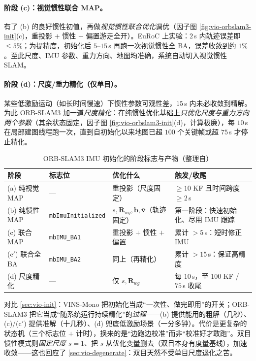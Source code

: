 \paragraph{阶段 (c)：视觉惯性联合 MAP。}
有了 (b) 的良好惯性初值，再做\emph{视觉惯性联合优化}调优（因子图 \cref{fig:vio-orbslam3-init}(c)，重投影 $+$ 惯性 $+$ 偏置游走全开）。EuRoC 上实验：$2\,$s 内轨迹误差即 $\le 5\%$；为提精度，初始化后 $5$--$15\,$s 再跑一次视觉惯性全 BA，误差收敛到约 $1\%$\cite{campos2021orbslam3}。至此尺度、IMU 参数、重力方向、地图均准确，系统自动切入视觉惯性 SLAM。

\paragraph{阶段 (d)：尺度/重力精化（仅单目）。}
某些低激励运动（如长时间慢速）下惯性参数可观性差，$15\,$s 内未必收敛到精解。为此 ORB-SLAM3 加一道\emph{尺度精化}：在纯惯性优化基础上\emph{只优化尺度与重力方向两个参数}（其余状态固定，因子图 \cref{fig:vio-orbslam3-init}(d)，计算极廉），每 $10\,$s 在局部建图线程跑一次，直到自初始化以来地图已超 $100$ 个关键帧或超 $75\,$s 才停止精化\cite{campos2021orbslam3}。

\begin{table}[H]\centering\small
\caption{ORB-SLAM3 IMU 初始化的阶段标志与产物（整理自\cite{campos2021orbslam3,campos2020inertialinit}）}
\label{tab:vio-orbslam3-init}
\begin{tabular}{llll}
\toprule
阶段 & 标志位 & 优化什么 & 触发/收尾 \\
\midrule
(a) 纯视觉 MAP & --- & 重投影（尺度固定） & $\ge 10$ KF 且时间跨度 $\ge 2\,$s \\
(b) 纯惯性 MAP & \texttt{mbImuInitialized} & $s,\mathbf{R}_{wg},\mathbf{b},\bar{\mathbf{v}}$（轨迹固定） & 第一阶段：快速初始化、尽用 IMU 跟踪 \\
(c) 联合 MAP & \texttt{mbIMU\_BA1} & 重投影 $+$ 惯性 $+$ 偏置 & 累计 $>5\,$s：短时修正 IMU \\
(c$'$) 联合全 BA & \texttt{mbIMU\_BA2} & 同上（再精化） & 累计 $>15\,$s：保证高精度 \\
(d) 尺度精化 & --- & 仅 $s,\mathbf{R}_{wg}$ & 每 $10\,$s，至 $100$ KF / $75\,$s 收尾 \\
\bottomrule
\end{tabular}
\end{table}

\begin{insight}
对比 \cref{sec:vio-init}：VINS-Mono 把初始化当成“一次性、做完即用”的开关；ORB-SLAM3 把它当成“随系统运行持续精化”的\emph{过程}——(b) 提供能用的粗解（几秒）、(c)/(c$'$) 提供准解（十几秒）、(d) 兜底低激励场景（一分多钟）。代价是更复杂的状态机（三个标志位 $+$ 计时），换来的是“边跑边校准”而非“校准好才敢跑”。双目惯性模式则\emph{固定尺度} $s\!=\!1$、把 $s$ 从优化变量删去（双目本身有度量基线），加速收敛——这也回应了 \cref{sec:vio-degenerate}：双目天然不受单目尺度退化之苦。
\end{insight}

